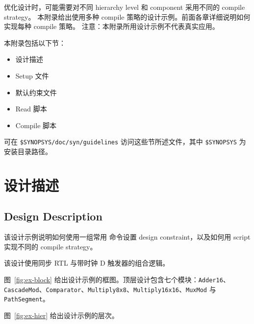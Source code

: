 \label{app:example}

优化设计时，可能需要对不同 hierarchy level 和 component 采用不同的 compile strategy。
本附录给出使用多种 compile 策略的设计示例。前面各章详细说明如何实现每种 compile 策略。
注意：本附录所用设计示例不代表真实应用。

本附录包括以下节：
\begin{itemize}
  \item 设计描述
  \item Setup 文件
  \item 默认约束文件
  \item Read 脚本
  \item Compile 脚本
\end{itemize}

可在 \texttt{\$SYNOPSYS/doc/syn/guidelines} 访问这些节所述文件，其中 \texttt{\$SYNOPSYS} 为安装目录路径。

\section{设计描述}
\subsection*{Design Description}

该设计示例说明如何使用一组常用  命令设置 design constraint，以及如何用 script 实现不同的 compile strategy。

该设计使用同步 RTL 与带时钟 D 触发器的组合逻辑。

图~\ref{fig:ex-block} 给出设计示例的框图。顶层设计包含七个模块：\texttt{Adder16}、\texttt{CascadeMod}、\texttt{Comparator}、\texttt{Multiply8x8}、\texttt{Multiply16x16}、\texttt{MuxMod} 与 \texttt{PathSegment}。


图~\ref{fig:ex-hier} 给出设计示例的层次。


